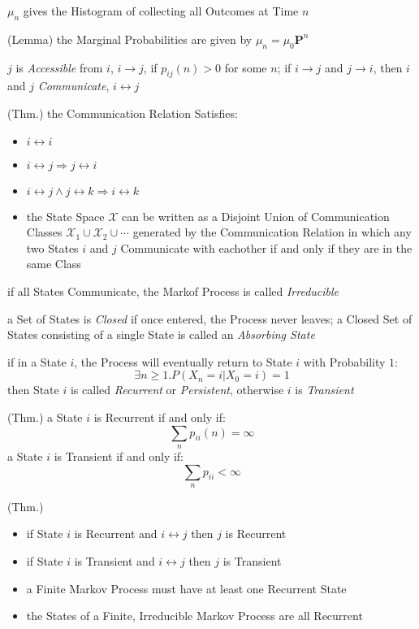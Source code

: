 $\mu_n$ gives the Histogram of collecting all Outcomes at Time $n$

(Lemma) the Marginal Probabilities are given by $\mu_n = \mu_0 \mathbf{P}^n$

$j$ is \emph{Accessible} from $i$, $i \to j$, if $p_{ij}(n) > 0$ for
some $n$; if $i \to j$ and $j \to i$, then $i$ and $j$
\emph{Communicate}, $i \leftrightarrow j$

(Thm.) the Communication Relation Satisfies:
\begin{itemize}
  \item $i \leftrightarrow i$
  \item $i \leftrightarrow j \Longrightarrow j \leftrightarrow i$
  \item $i \leftrightarrow j \wedge j \leftrightarrow k \Longrightarrow
    i \leftrightarrow k$
  \item the State Space $\mathcal{X}$ can be written as a Disjoint Union of
    Communication Classes $\mathcal{X}_1 \cup \mathcal{X}_2 \cup \cdots$
    generated by the Communication Relation in which any two States $i$ and $j$
    Communicate with eachother if and only if they are in the same Class
\end{itemize}

if all States Communicate, the Markof Process is called \emph{Irreducible}

a Set of States is \emph{Closed} if once entered, the Process never leaves; a
Closed Set of States consisting of a single State is called an \emph{Absorbing
  State}

if in a State $i$, the Process will eventually return to State $i$ with
Probability $1$:
\[
  \exists n \geq 1 . P(X_n = i | X_0 = i) = 1
\]
then State $i$ is called \emph{Recurrent} or \emph{Persistent}, otherwise $i$ is
\emph{Transient}

(Thm.) a State $i$ is Recurrent if and only if:
\[
  \sum_n p_{ii}(n) = \infty
\]
a State $i$ is Transient if and only if:
\[
  \sum_n p_{ii} < \infty
\]

(Thm.)
\begin{itemize}
  \item if State $i$ is Recurrent and $i \leftrightarrow j$ then $j$ is
    Recurrent
  \item if State $i$ is Transient and $i \leftrightarrow j$ then $j$ is
    Transient
  \item a Finite Markov Process must have at least one Recurrent State
  \item the States of a Finite, Irreducible Markov Process are all Recurrent
\end{itemize}

